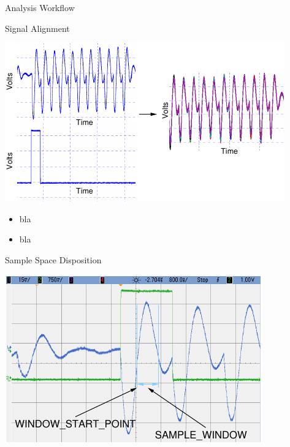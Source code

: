 \documentclass[xcolor=pdftex,dvipsnames,table,final]{beamer}
\begin{document}
\begin{frame}[fragile]{}
\begin{columns}[t]
\begin{column}{.31\linewidth}
\begin{block}{Analysis Workflow}
       \end{block}
       \begin{block}{Signal Alignment}
        \begin{minipage}[t]{0.49\linewidth}
          \includegraphics[scale=2.0]{../figures/alignedTraces}
        \end{minipage}%
        \begin{minipage}[t]{0.49\linewidth}
         \begin{itemize}
           \item bla
           \item bla
         \end{itemize} 
        \end{minipage}
       \end{block}
       \begin{block}{Sample Space Disposition}
        \begin{minipage}[t]{0.49\linewidth}%
		\includegraphics[width=0.9\linewidth]{../figures/oscilloscope-sample-window}

\end{minipage}
\end{block}
\end{column}
\end{columns}
\end{frame}
\end{document}
